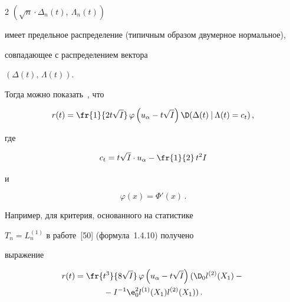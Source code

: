 \begin{multicols}{2}
$\left (\sqrt{n}\cdot \Delta_n(t),\:\Lambda_n(t)\right )




$ %


имеет предельное распределение (типичным образом двумерное нормальное),


совпадающее с распределением вектора




$\left (\Delta(t),\,\Lambda(t)\right)$.






Тогда можно показать~\cite{19be, 25be}, что


\begin{equation}


r(t) = \fr{1}{2t\sqrt{I}}\,\varphi\left (


u_{\alpha}-t\sqrt{I}\right )


{\D}(\Delta(t)\:|\:\Lambda(t) = c_t)\,,


\label{6.37b}


\end{equation}


где


$$


c_t= t\sqrt{I}\cdot u_{\alpha}-\fr{1}{2}\,t^2I


$$ 


и 


$$


\varphi(x)


=\Phi'(x)\,.


$$ 





Например, для критерия, основанного на статистике


$T_n =L_n^{(1)}$ в работе~[50] (формула~1.4.10) получено


выражение


\begin{multline*}


r(t) =\fr{t^3}{8\sqrt{I}}\,\varphi\left (u_{\alpha}-t\sqrt{I}\right )


({\D}_0l^{(2)}(X_1)-{}\\


{}-I^{-1}{\e}_0^2l^{(1)}(X_1)l^{(2)}(X_1))\,.


\end{multline*}



\end{multicols}
